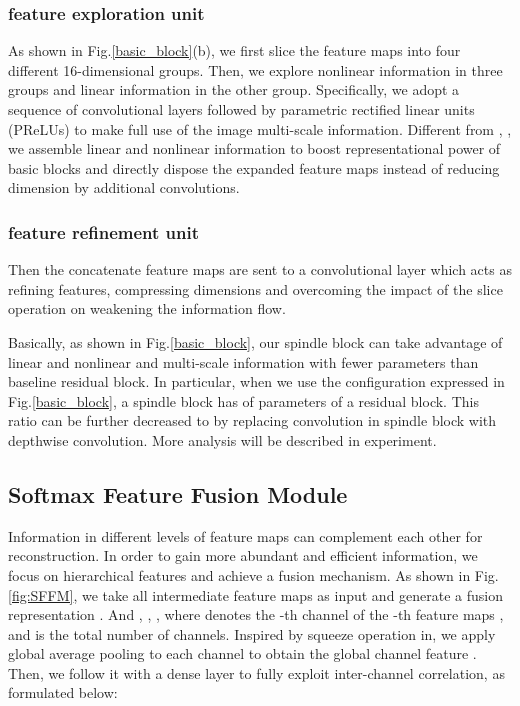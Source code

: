 \documentclass[journal]{IEEEtran}
\begin{document}
\subsubsection{feature exploration unit}
As shown in Fig.\ref{basic_block}(b), we first slice the feature maps into four different 16-dimensional groups. Then, we explore nonlinear information in three groups and linear information in the other group. Specifically, we adopt a sequence of  convolutional layers followed by parametric rectified linear units (PReLUs) to make full use of the image multi-scale information. Different from \cite{szegedy2015going}, \cite{szegedy2017inception}, we assemble linear and nonlinear information to boost representational power of basic blocks and directly dispose the expanded feature maps instead of reducing dimension by additional  convolutions.
\subsubsection{feature refinement unit}
Then the concatenate feature maps are sent to a  convolutional layer which acts as refining features, compressing dimensions and overcoming the impact of the slice operation on weakening the information flow.

\par Basically, as shown in Fig.\ref{basic_block}, our spindle block can take advantage of linear and nonlinear and multi-scale information with fewer parameters than baseline residual block. In particular, when we use the configuration expressed in Fig.\ref{basic_block}, a spindle block has  of parameters of a residual block. This ratio can be further decreased to  by replacing  convolution in spindle block with depthwise convolution. More analysis will be described in experiment.
\subsection{Softmax Feature Fusion Module}
Information in different levels of feature maps can complement each other for reconstruction. In order to gain more abundant and efficient information, we focus on hierarchical features and achieve a fusion mechanism. As shown in Fig.\ref{fig:SFFM}, we take all intermediate feature maps  as input and generate a fusion representation . And , , , where  denotes the -th channel of the -th feature maps , and  is the total number of channels. Inspired by squeeze operation in\cite{hu2017squeeze}, we apply global average pooling to each channel to obtain the global channel feature . Then, we follow it with a dense layer to fully exploit inter-channel correlation, as formulated below:
\end{document}
